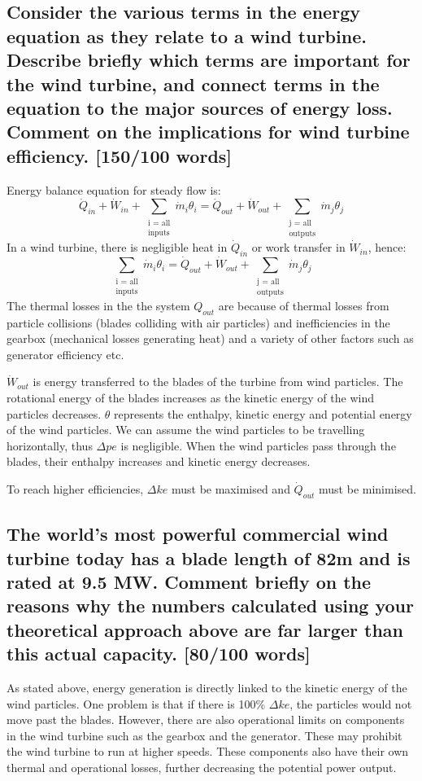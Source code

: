 \documentclass[12pt]{article}
\numberwithin{equation}{section}
\begin{document}
\begin{flushleft}
\subsection[Terms important for wind turbine.]{Consider the various terms in the energy equation as they relate to a wind turbine. Describe briefly which terms are important for the wind turbine, and connect terms in the equation to the major sources of energy loss. Comment on the implications for wind turbine efficiency. [150/100 words]}
Energy balance equation for steady flow is:
\begin{equation}
  \dot{Q}_{in} + \dot{W}_{in} + \sum_{\substack{\text{i = all} \\ \text{inputs}}} \dot{m}_i \theta_i = \dot{Q}_{out} + \dot{W}_{out} + \sum_{\substack{\text{j = all} \\ \text{outputs}}} \dot{m}_j \theta_j 
\end{equation}
In a wind turbine, there is negligible heat in $\dot{Q}_{in}$ or work transfer in $\dot{W}_{in}$, hence:
\begin{equation}
  \sum_{\substack{\text{i = all} \\ \text{inputs}}} \dot{m}_i \theta_i =  \dot{Q}_{out} + \dot{W}_{out} + \sum_{\substack{\text{j = all} \\ \text{outputs}}} \dot{m}_j \theta_j 
\end{equation}
The thermal losses in the the system $\si{Q}_{out}$ are because of thermal losses from particle collisions (blades colliding with air particles) and inefficiencies in the gearbox (mechanical losses generating heat) and a variety of other factors such as generator efficiency etc.

$\dot{W}_{out}$ is energy transferred to the blades of the turbine from wind particles. The rotational energy of the blades increases as the kinetic energy of the wind particles decreases. $\theta$ represents the enthalpy, kinetic energy and potential energy of the wind particles. We can assume the wind particles to be travelling horizontally, thus $\Delta pe$ is negligible. When the wind particles pass through the blades, their enthalpy increases and kinetic energy decreases. 

To reach higher efficiencies, $\Delta ke$ must be maximised and $\dot{Q}_{out}$ must be minimised.
\subsection[Power value discrepancies.]{The world’s most powerful commercial wind turbine today has a blade length of 82m and is rated at 9.5 MW. Comment briefly on the reasons why the numbers calculated using your theoretical approach above are far larger than this actual capacity. [80/100 words]}
As stated above, energy generation is directly linked to the kinetic energy of the wind particles. One problem is that if there is 100\% $\Delta ke$, the particles would not move past the blades. However, there are also operational limits on components in the wind turbine such as the gearbox and the generator. These may prohibit the wind turbine to run at higher speeds. These components also have their own thermal and operational losses, further decreasing the potential power output.


\end{flushleft}
\end{document}
